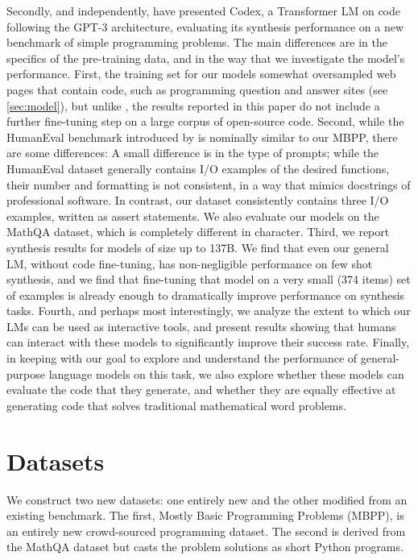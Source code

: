 Secondly, and independently, \cite{codex} have presented Codex, a Transformer LM on code following the GPT-3 architecture, evaluating its synthesis performance on a new benchmark of simple programming problems. The main differences are in the specifics of the pre-training data, and in the way that we investigate the model's performance. First,  the training set for our models somewhat oversampled web pages that contain code, such as programming question and answer sites (see \autoref{sec:model}), but unlike \cite{codex}, the results reported in this paper do not include a further fine-tuning step on a large corpus of open-source code. Second, while the HumanEval benchmark introduced by \cite{codex} is nominally similar to our MBPP, there are some differences: A small difference is in the type of prompts; while the HumanEval dataset generally contains I/O examples of the desired functions, their number and formatting is not consistent, in a way that mimics docstrings of professional software. In contrast, our dataset consistently contains three I/O examples, written as assert statements. We also evaluate our models on the MathQA dataset, which is completely different in character. Third, we report synthesis results for models of size up to 137B. We find that even our general LM, without code fine-tuning, has non-negligible performance on few shot synthesis, and we find that fine-tuning that model on a very small (374 items) set of examples is already enough to dramatically improve performance on synthesis tasks. Fourth, and perhaps most interestingly, we analyze the extent to which our LMs can be used as interactive tools, and present results showing that humans can interact with these models to significantly improve their success rate. Finally, in keeping with our goal to explore and understand the performance of general-purpose language models on this task, we also explore whether these models can evaluate the code that they generate, and whether they are equally effective at generating code that solves traditional mathematical word problems.

\section{Datasets}

We construct two new datasets: one entirely new and the other modified from an existing benchmark. The first, Mostly Basic Programming Problems (MBPP), is an entirely new crowd-sourced programming dataset. The second is derived from the MathQA dataset \citep{MATHQA} but casts the problem solutions as short Python programs.

